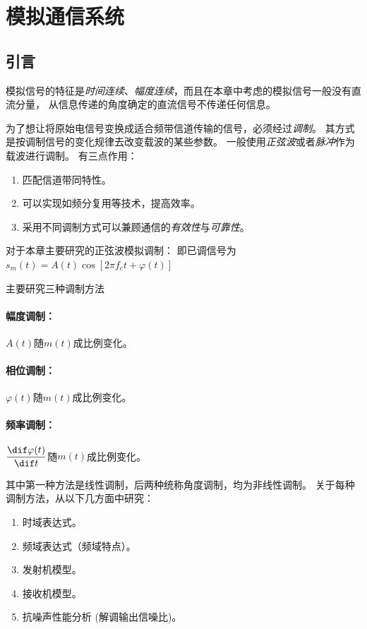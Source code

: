 \section{模拟通信系统}\label{chapter:IV}
\subsection{引言}
    模拟信号的特征是\emph{时间连续}、\emph{幅度连续}，而且在本章中考虑的模拟信号一般没有直流分量，
    从信息传递的角度确定的直流信号不传递任何信息。

    为了想让将原始电信号变换成适合频带信道传输的信号，必须经过\emph{调制}。
    其方式是按调制信号的变化规律去改变载波的某些参数。
    一般使用\emph{正弦波}或者\emph{脉冲}作为载波进行调制。
    有三点作用：
    \begin{enumerate}[itemsep=0pt,parsep=0em,label=\color{bupt}\arabic*、,labelsep=0pt,leftmargin=4em]
        \item 匹配信道带同特性。
        \item 可以实现如频分复用等技术，提高效率。
        \item 采用不同调制方式可以兼顾通信的\emph{有效性}与\emph{可靠性}。
    \end{enumerate}
    
    \noindent 对于本章主要研究的正弦波模拟调制：
    即已调信号为$s_m(t)=A(t)\cos[2\pi f_ct+\varphi(t)]$

    \noindent 主要研究三种调制方法
    \paragraph{幅度调制：}$A(t)$随$m(t)$成比例变化。
    \paragraph{相位调制：}$\varphi(t)$随$m(t)$成比例变化。
    \vspace{-1ex}
    \paragraph{频率调制：}$\dfrac{\dif \varphi(t)}{\dif t}$随$m(t)$成比例变化。
    \vspace{3ex}

    其中第一种方法是线性调制，后两种统称角度调制，均为非线性调制。
    关于每种调制方法，从以下几方面中研究：
    \begin{enumerate}[itemsep=0pt,parsep=0em,label=\color{bupt}\arabic*、,labelsep=0pt,leftmargin=4em]
        \item 时域表达式。
        \item 频域表达式（频域特点）。
        \item 发射机模型。
        \item 接收机模型。
        \item 抗噪声性能分析 (解调输出信噪比)。
    \end{enumerate}

